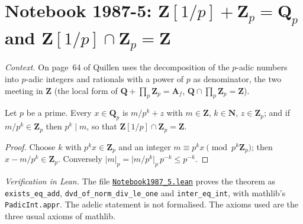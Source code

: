 \section[{Notebook 1987-5: $\mathbf Z[1/p] + \mathbf Z_p = \mathbf Q_p$}]{Notebook 1987-5: $\mathbf Z[1/p] + \mathbf Z_p = \mathbf Q_p$ and $\mathbf Z[1/p] \cap \mathbf Z_p = \mathbf Z$\protect{}}\label{sec:quillen-1987-5}

\emph{Context.} On page~64 of  Quillen uses the decomposition of the $p$-adic numbers into $p$-adic integers and rationals with a power of $p$ as denominator, the two meeting in $\mathbf Z$ (the local form of $\mathbf Q + \prod_p\mathbf Z_p = \mathbf A_f$, $\mathbf Q \cap \prod_p\mathbf Z_p = \mathbf Z$).

\begin{encadre}
\begin{theoreme}\label{thm:quillen-1987-5}
Let $p$ be a prime. Every $x \in \mathbf Q_p$ is $m/p^k + z$ with $m \in \mathbf Z$, $k \in \mathbf N$, $z \in \mathbf Z_p$; and if $m/p^k \in \mathbf Z_p$ then $p^k \mid m$, so that $\mathbf Z[1/p] \cap \mathbf Z_p = \mathbf Z$.
\end{theoreme}
\end{encadre}

\begin{proof}
Choose $k$ with $p^kx \in \mathbf Z_p$ and an integer $m \equiv p^kx \pmod{p^k\mathbf Z_p}$; then $x - m/p^k \in \mathbf Z_p$. Conversely $\lvert m\rvert_p = \lvert m/p^k\rvert_p\,p^{-k} \le p^{-k}$.
\end{proof}

\emph{Verification in Lean.} The file \href{\leanblobmain/Notebook1987_5.lean}{\texttt{Notebook1987\_5.\allowbreak{}lean}} proves the theorem as \texttt{exists\_eq\_add}, \texttt{dvd\_of\_norm\_div\_le\_one} and \texttt{inter\_eq\_int}, with mathlib's \texttt{PadicInt.appr}. The adelic statement is not formalised. The axioms used are the three usual axioms of mathlib.


